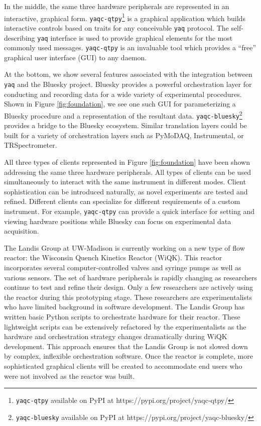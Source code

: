 \documentclass[aip, amsmath, amssymb, reprint,]{revtex4-2}
\newcommand\yaq{\texttt{yaq}}
\begin{document}
In the middle, the same three hardware peripherals are represented in an interactive, graphical form.
\texttt{yaqc-qtpy}\footnote{\texttt{yaqc-qtpy} available on PyPI at https://pypi.org/project/yaqc-qtpy/} is a graphical application which builds interactive controls based on traits for any conceivable \yaq{} protocol.
The self-describing \yaq{} interface is used to provide graphical elements for the most commonly used messages.
\texttt{yaqc-qtpy} is an invaluable tool which provides a ``free'' graphical user interface (GUI) to any daemon.

At the bottom, we show several features associated with the integration between \yaq{} and the Bluesky project\cite{AllanDanielB2019a}.
Bluesky provides a powerful orchestration layer for conducting and recording data for a wide variety of experimental procedures.
Shown in Figure \ref{fig:foundation}, we see one such GUI for parameterizing a Bluesky procedure and a representation of the resultant data.
\texttt{yaqc-bluesky}\footnote{\texttt{yaqc-bluesky} available on PyPI at https://pypi.org/project/yaqc-bluesky/} provides a bridge to the Bluesky ecosystem.
Similar translation layers could be built for a variety of orchestration layers such as PyMoDAQ\cite{WeberSebastien2021a}, Instrumental\cite{Bogdanowicz2022}, or TRSpectrometer\cite{trspectrometer}.

All three types of clients represented in Figure \ref{fig:foundation} have been shown addressing the same three hardware peripherals.
All types of clients can be used simultaneously to interact with the same instrument in different modes.
Client sophistication can be introduced naturally, as novel experiments are tested and refined.
Different clients can specialize for different requirements of a custom instrument.
For example, \texttt{yaqc-qtpy} can provide a quick interface for setting and viewing hardware positions while Bluesky can focus on experimental data acquisition.

The Landis Group at UW-Madison is currently working on a new type of flow reactor: the Wisconsin Quench Kinetics Reactor (WiQK).
This reactor incorporates several computer-controlled valves and syringe pumps as well as various sensors.
The set of hardware peripherals is rapidly changing as researchers continue to test and refine their design.
Only a few researchers are actively using the reactor during this prototyping stage.
These researchers are experimentalists who have limited background in software development.
The Landis Group has written basic Python scripts to orchestrate hardware for their reactor.
These lightweight scripts can be extensively refactored by the experimentalists as the hardware and orchestration strategy changes dramatically during WiQK development.
This approach ensures that the Landis Group is not slowed down by complex, inflexible orchestration software.
Once the reactor is complete, more sophisticated graphical clients will be created to accommodate end users who were not involved as the reactor was built.
\end{document}
